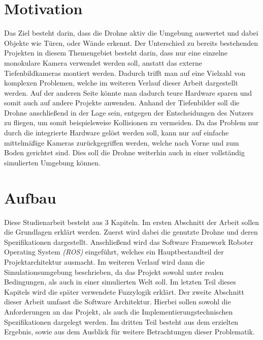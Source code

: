 \section{Motivation}
Das Ziel besteht darin, dass die Drohne aktiv die Umgebung auswertet und dabei Objekte wie Türen, oder Wände erkennt. Der Unterschied zu bereits bestehenden Projekten in diesem Themengebiet besteht darin, dass nur eine einzelne monokulare Kamera verwendet werden soll, anstatt das externe Tiefenbildkameras montiert werden. \newline
Dadurch trifft man auf eine Vielzahl von komplexen Problemen, welche im weiteren Verlauf dieser Arbeit dargestellt werden. Auf der anderen Seite könnte man dadurch teure Hardware sparen und somit auch auf andere Projekte anwenden. \newline
Anhand der Tiefenbilder soll die Drohne anschließend in der Lage sein, entgegen der Entscheidungen des Nutzers zu fliegen, um somit beispielsweise Kollisionen zu vermeiden. \newline
Da das Problem nur durch die integrierte Hardware gelöst werden soll, kann nur auf einfache mittelmäßige Kameras zurückgegriffen werden, welche nach Vorne und zum Boden gerichtet sind.
Dies soll die Drohne weiterhin auch in einer vollständig simulierten Umgebung können.




\section{Aufbau}
Diese Studienarbeit besteht aus 3 Kapiteln. Im ersten Abschnitt der Arbeit sollen die Grundlagen erklärt werden. Zuerst wird dabei die genutzte Drohne und deren Spezifikationen dargestellt. \newline
Anschließend wird das Software Framework Roboter Operating System \emph{(ROS)} eingeführt, welches ein Hauptbestandteil der Projektarchitektur ausmacht.\newline
Im weiteren Verlauf wird dann die Simulationsumgebung beschrieben, da das Projekt sowohl unter realen Bedingungen, als auch in einer simulierten Welt soll. 
Im letzten Teil dieses Kapitels wird die später verwendete Fuzzylogik erklärt. \newline
Der zweite Abschnitt dieser Arbeit umfasst die Software Architektur. Hierbei sollen sowohl die Anforderungen an das Projekt, als auch die Implementierungstechnischen Spezifikationen dargelegt werden.
Im dritten Teil besteht aus dem erzielten Ergebnis, sowie aus dem Ausblick für weitere Betrachtungen dieser Problematik.

